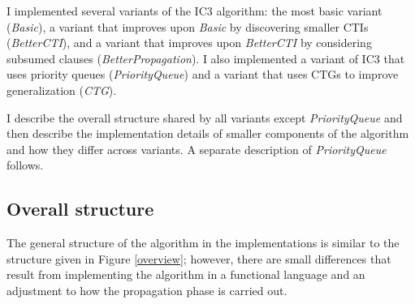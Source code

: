 \documentclass[12pt,a4paper,twoside,openright]{report}
\begin{document}
{{I implemented several variants of the IC3 algorithm:
the most basic variant (\emph{Basic}), a variant that
improves upon \emph{Basic} by discovering smaller CTIs (\emph{BetterCTI}),
and a variant that improves upon \emph{BetterCTI} by considering subsumed clauses
(\emph{BetterPropagation}).
I also implemented a variant of IC3 that uses priority queues (\emph{PriorityQueue})
and a variant that uses CTGs to improve generalization (\emph{CTG}).

I describe the overall structure shared by all variants except
\emph{PriorityQueue} and then describe the implementation
details of smaller components of the algorithm and how they differ across
variants. A separate description of \emph{PriorityQueue}
follows.

\subsection{Overall structure}

The general structure of the algorithm in the implementations is similar
to the structure given in Figure \ref{overview}; however, there are
small differences that result from implementing the algorithm in a
functional language and an adjustment to how the propagation phase is
carried out.

}}
\end{document}
